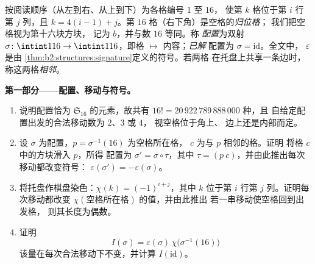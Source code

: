 \begin{problem}
\label{pb:b2:structures:1}
按阅读顺序（从左到右、从上到下）为各格编号 $1$ 至 $16$，
使第 $k$ 格位于第 $i$ 行第 $j$ 列，且 $k
= 4(i - 1) + j$。第 $16$ 格（右下角）是空格的\emph{归位格}；
我们把空格视为第十六块方块，
记为 $b$，并与数 $16$ 等同。称
\emph{配置}为双射 $\sigma \colon \intint1{16}
\to \intint1{16}$，即格 $\mapsto$ 内容；\emph{已解}
配置为 $\sigma = \mathrm{id}$。全文中，
$\varepsilon$ 是由
\cref{thm:b2:structures:signature}定义的符号。若两格
在托盘上共享一条边时，称这两格\emph{相邻}。

\medskip
\noindent\textbf{第一部分——配置、移动与符号。}
\begin{enumerate}
  \item 说明配置恰为
        $\mathfrak{S}_{16}$ 的元素，故共有 $16! =
        20\,922\,789\,888\,000$ 种，且
        自给定配置出发的合法移动数为 $2$、$3$ 或 $4$，
        视空格位于角上、
        边上还是内部而定。
  \item 设 $\sigma$ 为配置，$p = \sigma^{-1}(16)$ 为空格所在格，
        $c$ 为与 $p$ 相邻的格。证明
        将格 $c$ 中的方块滑入 $p$，所得
        配置为 $\sigma' = \sigma \circ \tau$，其中 $\tau =
        (p\ c)$，并由此推出每次移动都改变符号：
        $\varepsilon(\sigma') = -\varepsilon(\sigma)$。
  \item 将托盘作棋盘染色：$\chi(k) = (-1)^{i+j}$，其中
        $k$ 位于第 $i$ 行第 $j$ 列。证明每次移动都改变
        $\chi(\text{空格所在格})$ 的值，并由此推出
        若一串移动使空格回到出发格，
        则其长度为偶数。
  \item 证明
        \[
        I(\sigma) = \varepsilon(\sigma)\,
        \chi\bigl(\sigma^{-1}(16)\bigr)
        \]
        该量在每次合法移动下不变，并计算
        $I(\mathrm{id})$。
\end{enumerate}


\end{problem}
